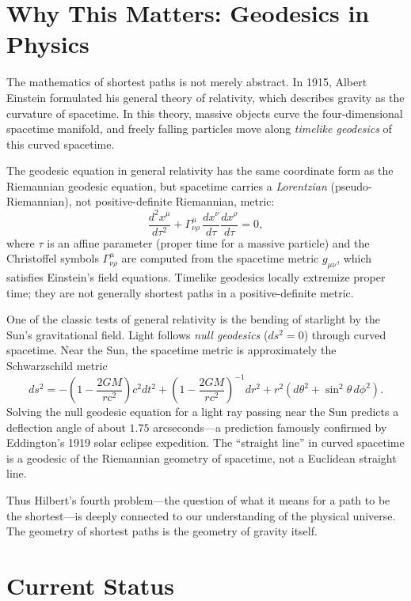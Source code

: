 \section{Why This Matters: Geodesics in Physics}

The mathematics of shortest paths is not merely abstract. In 1915, Albert Einstein formulated his general theory of relativity, which describes gravity as the curvature of spacetime. In this theory, massive objects curve the four-dimensional spacetime manifold, and freely falling particles move along \emph{timelike geodesics} of this curved spacetime.

The geodesic equation in general relativity has the same coordinate form as the Riemannian geodesic equation, but spacetime carries a \emph{Lorentzian} (pseudo-Riemannian), not positive-definite Riemannian, metric:
\[
\frac{d^2 x^\mu}{d\tau^2} + \Gamma^\mu_{\nu\rho}\,\frac{dx^\nu}{d\tau}\frac{dx^\rho}{d\tau} = 0,
\]
where $\tau$ is an affine parameter (proper time for a massive particle) and the Christoffel symbols $\Gamma^\mu_{\nu\rho}$ are computed from the spacetime metric $g_{\mu\nu}$, which satisfies Einstein's field equations. Timelike geodesics locally extremize proper time; they are not generally shortest paths in a positive-definite metric.

\begin{example}
One of the classic tests of general relativity is the bending of starlight by the Sun's gravitational field. Light follows \emph{null geodesics} ($ds^2 = 0$) through curved spacetime. Near the Sun, the spacetime metric is approximately the Schwarzschild metric
\[
ds^2 = -\left(1-\frac{2GM}{rc^2}\right)c^2 dt^2 + \left(1-\frac{2GM}{rc^2}\right)^{-1}dr^2 + r^2(d\theta^2 + \sin^2\theta\,d\phi^2).
\]
Solving the null geodesic equation for a light ray passing near the Sun predicts a deflection angle of about $1.75$ arcseconds---a prediction famously confirmed by Eddington's 1919 solar eclipse expedition. The ``straight line'' in curved spacetime is a geodesic of the Riemannian geometry of spacetime, not a Euclidean straight line.
\end{example}

Thus Hilbert's fourth problem---the question of what it means for a path to be the shortest---is deeply connected to our understanding of the physical universe. The geometry of shortest paths is the geometry of gravity itself.

\section{Current Status}

